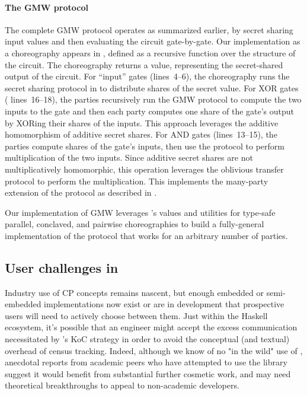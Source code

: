 \paragraph{The GMW protocol}
The complete GMW protocol operates as summarized earlier, by secret sharing input values and then evaluating the circuit gate-by-gate.
Our implementation as a \MultiChor choreography appears in ,
defined as a recursive function over the structure of the circuit.
The choreography returns a  value, representing the secret-shared output of the circuit.
For ``input'' gates (lines~4--6), the choreography runs the secret sharing protocol in 
to distribute shares of the secret value.
For XOR gates ( lines~16--18),
the parties recursively run the GMW protocol to compute the two inputs to the gate
and then each party computes one share of the gate's output by XORing their shares of the inputs.
This approach leverages the additive homomorphism of additive secret shares.
For AND gates (lines~13--15), the parties compute shares of the gate's inputs,
then use the  protocol to perform multiplication of the two inputs.
Since additive secret shares are not multiplicatively homomorphic,
this operation leverages the oblivious transfer protocol to perform the multiplication.
This implements the many-party extension of the protocol as described in \cite{evans2018pragmatic,gmwSlides}.

Our implementation of GMW leverages \MultiChor's  values
and utilities for type-safe parallel, conclaved, and pairwise choreographies to build a fully-general implementation
of the protocol that works for an arbitrary number of parties.


\subsection{User challenges in \MultiChor}
\label{sec:usability}

Industry use of CP concepts remains nascent,
but enough embedded or semi-embedded implementations now exist or are in development that prospective users
will need to actively choose between them.
Just within the Haskell ecosystem, it's possible that an engineer might accept the excess communication necessitated by \HasChor's
KoC strategy in order to avoid the conceptual (and textual) overhead of census tracking.
Indeed, although we know of no "in the wild" use of \MultiChor,
anecdotal reports from academic peers who have attempted to use the library suggest it would benefit from substantial further cosmetic work,
and may need theoretical breakthroughs to appeal to non-academic developers.

